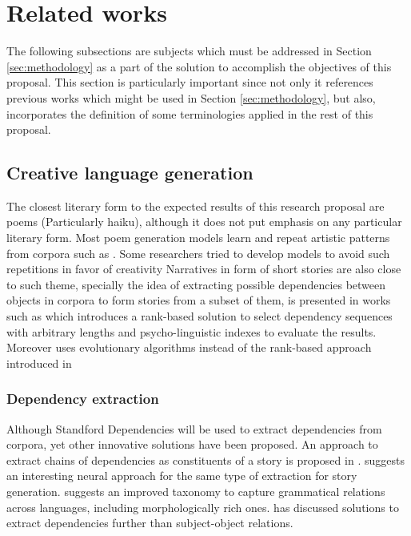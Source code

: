 \documentclass{article}
\begin{document}
	\section {Related works} \label{sec:related-works}
	The following subsections are subjects which must be addressed in Section \ref{sec:methodology} as a part of the solution to accomplish the objectives of this proposal. This section is particularly important since not only it references previous works which might be used in Section \ref{sec:methodology}, but also, incorporates the definition of some terminologies applied in the rest of this proposal. 
	\subsection{Creative language generation}
	The closest literary form to the expected results of this research proposal are poems (Particularly haiku), although it does not put emphasis on any particular literary form. Most poem generation models learn and repeat artistic patterns from corpora such as \citet{daza-2016-automatic-text-generation-by-learning-from-literary-structures}. Some researchers tried to develop models to avoid such repetitions in favor of creativity \citep{wu-2019-evaluating-image-inspired-poetry-generation} Narratives in form of short stories are also close to such theme, specially the idea of extracting possible dependencies between objects in corpora to form stories from a subset of them, is presented in works such as \citet{mcintyre-2009-learning-to-tell-tales-a-data-driven-approach-to-story-generation} which introduces a rank-based solution to select dependency sequences with arbitrary lengths and psycho-linguistic indexes to evaluate the results. Moreover \citet{mcintyre-2010-plot-induction-and-evolutionary-search-for-story-generation} uses evolutionary algorithms instead of the rank-based approach introduced in \citet{mcintyre-2009-learning-to-tell-tales-a-data-driven-approach-to-story-generation}
	\subsubsection{Dependency extraction}
	\label{sec:related-works-dependency-extraction}
	Although Standford Dependencies \citep{schuster-2016-enhanced-english-universal-dependencies-an-improved-representation-for-natural-language-understanding-tasks} will be used to extract dependencies from corpora, yet other innovative solutions have been proposed. An approach to extract chains of dependencies as constituents of a story is proposed in  \citep{chambers-2008-unsupervised-learning-of-narrative-event-chains}.
	\citet{martin-2018-event-representations-for-automated-story-generation-with-deep-neural-nets} suggests an interesting neural approach for the same type of extraction for story generation.	
	\cite{de-marneffe-2014-universal-stanford-dependencies-a-cross-linguistic-typology} suggests an improved taxonomy to capture grammatical
	relations across languages, including morphologically rich ones.  \cite{nivre-2016-universal-dependencies-v1-a-multilingual-treebank-collection} has discussed solutions to extract dependencies further than subject-object relations. 
\end{document}
